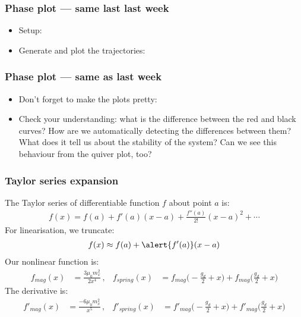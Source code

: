 \documentclass[9pt]{beamer-control}
\begin{document}
\begin{frame}
\frametitle{Phase plot --- same last last week}

\begin{itemize}
\item Setup:
\end{itemize}

\begin{itemize}
\item Generate and plot the trajectories:
\end{itemize}

\end{frame}

\begin{frame}
\frametitle{Phase plot --- same as last week}

\begin{itemize}
\item Don't forget to make the plots pretty:
\end{itemize}


\begin{itemize}
\item Check your understanding: what is the difference between the red and black curves? How are we automatically detecting the differences between them? What does it tell us about the stability of the system? Can we see this behaviour from the quiver plot, too?
\end{itemize}

\end{frame}



\begin{frame}
\frametitle{Taylor series expansion}
The Taylor series of differentiable function $f$ about point $a$ is:
\begin{align}
f(x) = f(a) + f'(a)(x - a) + \frac{f''(a)}{2!}(x - a)^2 + \cdots
\end{align}
For linearisation, we truncate:
\begin{align}
f(x) \approx f(a) + \alert{f'(a)}(x - a)
\end{align}
Our nonlinear function is:
\begin{align}
f_{mag}(x)  &= \frac{3 \mu_0 m_x^2}{2 x^4} \,, & f_{spring}(x)  &= f_{mag}\bigl(-\tfrac{g_d}{2}+x\bigr) + f_{mag}\bigl(\tfrac{g_d}{2}+x\bigr)
\end{align}
The derivative is:
\begin{align}
f'_{mag}(x)  &= \frac{-6 \mu_0 m_x^2}{x^5} \,, & f'_{spring}(x) &= f'_{mag}\bigl(-\tfrac{g_d}{2}+x\bigr) + f'_{mag}\bigl(\tfrac{g_d}{2}+x\bigr)
\end{align}
\end{frame}
\end{document}
